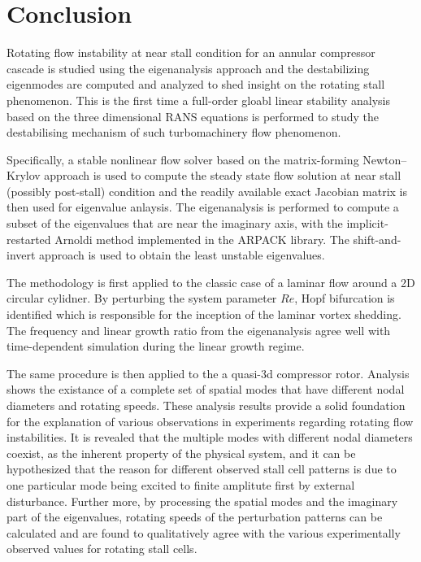 \documentclass[journal,final]{new-aiaa}
\begin{document}
\section{Conclusion}
\label{conclusion}

Rotating flow instability at near stall condition for an annular compressor cascade is studied using the eigenanalysis approach and the destabilizing eigenmodes are computed and
analyzed to shed insight on the rotating stall phenomenon. 
This is the first time a full-order gloabl linear stability analysis based on
the three dimensional RANS equations is performed to study the destabilising
mechanism of such turbomachinery flow phenomenon.

Specifically, a stable nonlinear flow solver based on the matrix-forming Newton--Krylov
approach is used to compute the steady state flow solution at near stall (possibly
post-stall) condition and the readily available exact Jacobian matrix is then used
for eigenvalue anlaysis. The eigenanalysis is performed to compute a subset of
the eigenvalues that are near the imaginary axis, with the implicit-restarted
Arnoldi method implemented in the ARPACK library. The shift-and-invert
approach is used to obtain the least unstable eigenvalues.

The methodology is first applied to the classic case of a laminar flow around
a 2D circular cylidner. By perturbing the system parameter $Re$, Hopf
bifurcation is identified which is responsible for the inception of the laminar
vortex shedding. The frequency and linear growth ratio from the eigenanalysis
agree well with time-dependent simulation during the linear growth regime.

The same procedure is then applied to the a quasi-3d compressor rotor.
Analysis shows the existance of a complete set of spatial modes that have
different nodal diameters and
rotating speeds. These analysis results provide a solid foundation for the
explanation of various observations in experiments regarding
rotating flow instabilities. It is revealed that the multiple modes with
different nodal diameters coexist, as the inherent property of the
physical system, and it can be hypothesized that the reason for
different observed stall cell patterns is due to one particular mode being
excited to finite amplitute first by external disturbance.
Further more, by processing the spatial modes and the imaginary
part of the eigenvalues, rotating speeds of the perturbation patterns
can be calculated and are found to qualitatively agree with the various
experimentally observed values for rotating stall cells.
\end{document}
